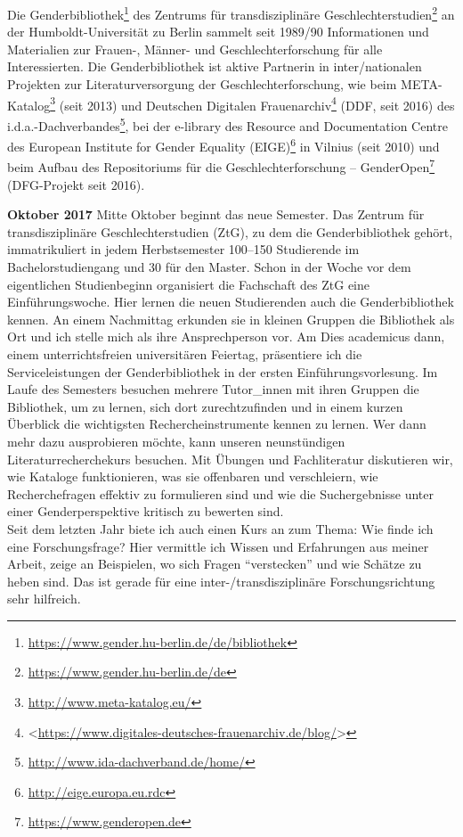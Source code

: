\documentclass[a4paper,
fontsize=11pt,
oneside,
numbers=noperiodatend,
parskip=half-,
bibliography=totoc,
final
]{scrartcl}
\begin{document}
Die Genderbibliothek\footnote{\url{https://www.gender.hu-berlin.de/de/bibliothek}}
des Zentrums für transdisziplinäre Geschlechterstudien\footnote{\url{https://www.gender.hu-berlin.de/de}}
an der Humboldt-Universität zu Berlin sammelt seit 1989/90 Informationen
und Materialien zur Frauen-, Männer- und Geschlechterforschung für alle
Interessierten. Die Genderbibliothek ist aktive Partnerin in
inter/nationalen Projekten zur Literaturversorgung der
Geschlechterforschung, wie beim META-Katalog\footnote{\url{http://www.meta-katalog.eu/}}
(seit 2013) und Deutschen Digitalen Frauenarchiv\footnote{\textless{}\url{https://www.digitales-deutsches-frauenarchiv.de/blog/}\textgreater{}}
(DDF, seit 2016) des i.d.a.-Dachverbandes\footnote{\url{http://www.ida-dachverband.de/home/}},
bei der e-library des Resource and Documentation Centre des European
Institute for Gender Equality (EIGE)\footnote{\url{http://eige.europa.eu.rdc}}
in Vilnius (seit 2010) und beim Aufbau des Repositoriums für die
Geschlechterforschung -- GenderOpen\footnote{\url{https://www.genderopen.de}}
(DFG-Projekt seit 2016).

\textbf{Oktober 2017} Mitte Oktober beginnt das neue Semester. Das
Zentrum für transdisziplinäre Geschlechterstudien (ZtG), zu dem die
Genderbibliothek gehört, immatrikuliert in jedem Herbstsemester 100--150
Studierende im Bachelorstudiengang und 30 für den Master. Schon in der
Woche vor dem eigentlichen Studienbeginn organisiert die Fachschaft des
ZtG eine Einführungswoche. Hier lernen die neuen Studierenden auch die
Genderbibliothek kennen. An einem Nachmittag erkunden sie in kleinen
Gruppen die Bibliothek als Ort und ich stelle mich als ihre
Ansprechperson vor. Am Dies academicus dann, einem unterrichtsfreien
universitären Feiertag, präsentiere ich die Serviceleistungen der
Genderbibliothek in der ersten Einführungsvorlesung. Im Laufe des
Semesters besuchen mehrere Tutor\_innen mit ihren Gruppen die
Bibliothek, um zu lernen, sich dort zurechtzufinden und in einem kurzen
Überblick die wichtigsten Rechercheinstrumente kennen zu lernen. Wer
dann mehr dazu ausprobieren möchte, kann unseren neunstündigen
Literaturrecherchekurs besuchen. Mit Übungen und Fachliteratur
diskutieren wir, wie Kataloge funktionieren, was sie offenbaren und
verschleiern, wie Recherchefragen effektiv zu formulieren sind und wie
die Suchergebnisse unter einer Genderperspektive kritisch zu bewerten
sind.\\
Seit dem letzten Jahr biete ich auch einen Kurs an zum Thema: Wie finde
ich eine Forschungsfrage? Hier vermittle ich Wissen und Erfahrungen aus
meiner Arbeit, zeige an Beispielen, wo sich Fragen \enquote{verstecken}
und wie Schätze zu heben sind. Das ist gerade für eine
inter-/transdisziplinäre Forschungsrichtung sehr hilfreich.
\end{document}

